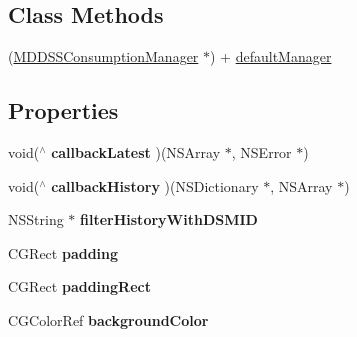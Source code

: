 \subsection*{Class Methods}
\begin{DoxyCompactItemize}
\item 
(\hyperlink{interface_m_d_d_s_s_consumption_manager}{M\-D\-D\-S\-S\-Consumption\-Manager} $\ast$) + \hyperlink{interface_m_d_d_s_s_consumption_manager_ac7a7890115eff0ddaf1e4022d474f4bc}{default\-Manager}
\end{DoxyCompactItemize}
\subsection*{Properties}
\begin{DoxyCompactItemize}
\item 
\hypertarget{interface_m_d_d_s_s_consumption_manager_a911f8a05a99ca741b5e36c59bab6f85f}{void($^\wedge$ {\bfseries callback\-Latest} )(N\-S\-Array $\ast$, N\-S\-Error $\ast$)}\label{interface_m_d_d_s_s_consumption_manager_a911f8a05a99ca741b5e36c59bab6f85f}

\item 
\hypertarget{interface_m_d_d_s_s_consumption_manager_a710c4c8abe3ecfb0555ae66cd7c0d938}{void($^\wedge$ {\bfseries callback\-History} )(N\-S\-Dictionary $\ast$, N\-S\-Array $\ast$)}\label{interface_m_d_d_s_s_consumption_manager_a710c4c8abe3ecfb0555ae66cd7c0d938}

\item 
\hypertarget{interface_m_d_d_s_s_consumption_manager_aa9437e121568771ef8c8154b7a115fac}{N\-S\-String $\ast$ {\bfseries filter\-History\-With\-D\-S\-M\-I\-D}}\label{interface_m_d_d_s_s_consumption_manager_aa9437e121568771ef8c8154b7a115fac}

\item 
\hypertarget{interface_m_d_d_s_s_consumption_manager_aa959f2a0c6d71d92fa17853d597736cf}{C\-G\-Rect {\bfseries padding}}\label{interface_m_d_d_s_s_consumption_manager_aa959f2a0c6d71d92fa17853d597736cf}

\item 
\hypertarget{interface_m_d_d_s_s_consumption_manager_a72e5d34d0dcff5ada9153d61c76889ef}{C\-G\-Rect {\bfseries padding\-Rect}}\label{interface_m_d_d_s_s_consumption_manager_a72e5d34d0dcff5ada9153d61c76889ef}

\item 
\hypertarget{interface_m_d_d_s_s_consumption_manager_a347ae0cd5bc07ac0b91bb2a11e4a1d92}{C\-G\-Color\-Ref {\bfseries background\-Color}}\label{interface_m_d_d_s_s_consumption_manager_a347ae0cd5bc07ac0b91bb2a11e4a1d92}


\end{DoxyCompactItemize}
